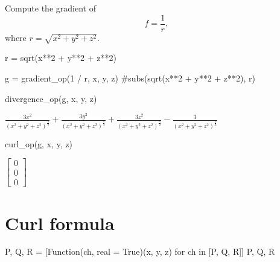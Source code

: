 \documentclass[
  a4paper,
  DIV=11,
  numbers=noendperiod]{scrreprt}
\newenvironment{Shaded}{\begin{snugshade}}{\end{snugshade}}
\newcommand{\CommentTok}[1]{\textcolor[rgb]{0.37,0.37,0.37}{#1}}
\newcommand{\ControlFlowTok}[1]{\textcolor[rgb]{0.00,0.23,0.31}{#1}}
\newcommand{\DecValTok}[1]{\textcolor[rgb]{0.68,0.00,0.00}{#1}}
\newcommand{\KeywordTok}[1]{\textcolor[rgb]{0.00,0.23,0.31}{#1}}
\newcommand{\NormalTok}[1]{\textcolor[rgb]{0.00,0.23,0.31}{#1}}
\newcommand{\OperatorTok}[1]{\textcolor[rgb]{0.37,0.37,0.37}{#1}}
\newcommand{\StringTok}[1]{\textcolor[rgb]{0.13,0.47,0.30}{#1}}
\newcommand{\VariableTok}[1]{\textcolor[rgb]{0.07,0.07,0.07}{#1}}
\begin{document}
Compute the gradient of \[
f = \frac{1}{r},
\] where \(r = \sqrt{x^2 + y^2 + z^2}\).

\begin{Shaded}
\begin{Highlighting}[]
\NormalTok{r }\OperatorTok{=}\NormalTok{ sqrt(x}\OperatorTok{**}\DecValTok{2} \OperatorTok{+}\NormalTok{ y}\OperatorTok{**}\DecValTok{2} \OperatorTok{+}\NormalTok{ z}\OperatorTok{**}\DecValTok{2}\NormalTok{)}
\end{Highlighting}
\end{Shaded}

\begin{Shaded}
\begin{Highlighting}[]
\NormalTok{g }\OperatorTok{=}\NormalTok{ gradient\_op(}\DecValTok{1} \OperatorTok{/}\NormalTok{ r, x, y, z) }\CommentTok{\#subs(sqrt(x**2 + y**2 + z**2), r)}
\end{Highlighting}
\end{Shaded}

\begin{Shaded}
\begin{Highlighting}[]
\NormalTok{divergence\_op(g, x, y, z)}
\end{Highlighting}
\end{Shaded}

$\displaystyle \frac{3 x^{2}}{\left(x^{2} + y^{2} + z^{2}\right)^{\frac{5}{2}}} + \frac{3 y^{2}}{\left(x^{2} + y^{2} + z^{2}\right)^{\frac{5}{2}}} + \frac{3 z^{2}}{\left(x^{2} + y^{2} + z^{2}\right)^{\frac{5}{2}}} - \frac{3}{\left(x^{2} + y^{2} + z^{2}\right)^{\frac{3}{2}}}$

\begin{Shaded}
\begin{Highlighting}[]
\NormalTok{curl\_op(g, x, y, z)}
\end{Highlighting}
\end{Shaded}

$\displaystyle \left[\begin{matrix}0\\0\\0\end{matrix}\right]$

\section{Curl formula}\label{curl-formula}

\begin{Shaded}
\begin{Highlighting}[]
\NormalTok{P, Q, R }\OperatorTok{=}\NormalTok{ [Function(ch, real }\OperatorTok{=} \VariableTok{True}\NormalTok{)(x, y, z) }\ControlFlowTok{for}\NormalTok{ ch }\KeywordTok{in}\NormalTok{ [}\StringTok{\textquotesingle{}P\textquotesingle{}}\NormalTok{, }\StringTok{\textquotesingle{}Q\textquotesingle{}}\NormalTok{, }\StringTok{\textquotesingle{}R\textquotesingle{}}\NormalTok{]]}
\NormalTok{P, Q, R}
\end{Highlighting}
\end{Shaded}
\end{document}
